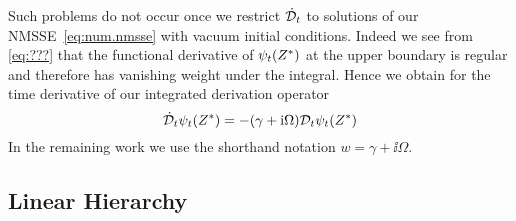 Such problems do not occur once we restrict $\dot{\mathcal{D}}_t$ to solutions of our NMSSE~\ref{eq:num.nmsse} with vacuum initial conditions.
Indeed we see from \autoref{eq:???} that the functional derivative of $\psitZ$ at the upper boundary is regular and therefore has vanishing weight under the integral.
Hence we obtain for the time derivative of our integrated derivation operator
\begin{equation}
  \dot\adjZZ_t \psitZ = - (\gamma + \ii \Omega) \adjZZ_t\psitZ
  \label{eq:num.dot_adjZZt}
\end{equation}
In the remaining work we use the shorthand notation $w = \gamma + \ii\Omega$.

\subsection{Linear Hierarchy}
\label{sub:num.sheom.lin}
%

